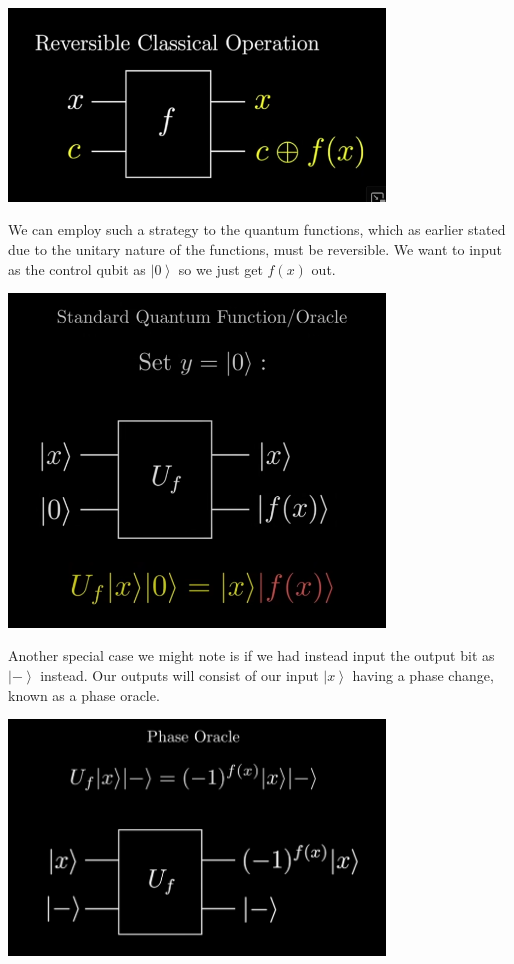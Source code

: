 \documentclass[10pt,oneside,a4paper]{article}
\newcommand{\qb}[1]{\left| #1 \right\rangle}
\begin{document}
\begin{center}
\includegraphics[width=10cm]{9}
\end{center}

We can employ such a strategy to the quantum functions, which as earlier stated due to the unitary nature of the functions, must be reversible. We want to input as the control qubit as $\qb{0}$ so we just get $f(x)$ out. 


\begin{center}
\includegraphics[width=10cm]{10}
\end{center}

Another special case we might note is if we had instead input the output bit as $\qb{-}$ instead. Our outputs will consist of our input $\qb{x}$ having a phase change, known as a phase oracle. 

\begin{center}
\includegraphics[width=10cm]{11}
\end{center}
\end{document}
